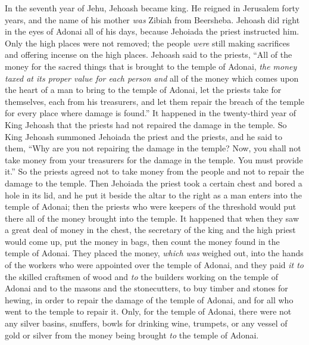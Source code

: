 \begin{biblechapter} %
 In the seventh year of Jehu, Jehoash became king. He reigned in Jerusalem forty years, and the name of his mother \textit{was} Zibiah from Beersheba.
\verse Jehoash did right in the eyes of Adonai all of his days, because Jehoiada the priest instructed him.
\verse Only the high places were not removed; the people \textit{were} still making sacrifices and offering incense on the high places.
 Jehoash said to the priests, “All of the money for the sacred things that is brought to the temple of Adonai, \textit{the money taxed at its proper value for each person} \textit{and} all of the money which comes upon the heart of a man to bring to the temple of Adonai,
\verse let the priests take for themselves, each from his treasurers, and let them repair the breach of the temple for every place where damage is found.”
\verse It happened in the twenty-third year of King Jehoash that the priests had not repaired the damage in the temple.
\verse So King Jehoash summoned Jehoiada the priest and the priests, and he said to them, “Why are you not repairing the damage in the temple? Now, you shall not take money from your treasurers for the damage in the temple. You must provide it.”
\verse So the priests agreed not to take money from the people and not to repair the damage to the temple.
\verse Then Jehoiada the priest took a certain chest and bored a hole in its lid, and he put it beside the altar to the right as a man enters into the temple of Adonai; then the priests who were keepers of the threshold would put there all of the money brought into the temple.
\verse It happened that when they saw a great deal of money in the chest, the secretary of the king and the high priest would come up, put the money in bags, then count the money found in the temple of Adonai.
\verse They placed the money, \textit{which was} weighed out, into the hands of the workers who were appointed over the temple of Adonai, and they paid \textit{it to} the skilled craftsmen of wood and \textit{to} the builders working on the temple of Adonai
\verse and to the masons and the stonecutters, to buy timber and stones for hewing, in order to repair the damage of the temple of Adonai, and for all who went to the temple to repair it.
\verse Only, for the temple of Adonai, there were not any silver basins, snuffers, bowls for drinking wine, trumpets, or any vessel of gold or silver from the money being brought \textit{to} the temple of Adonai.

\end{biblechapter}
